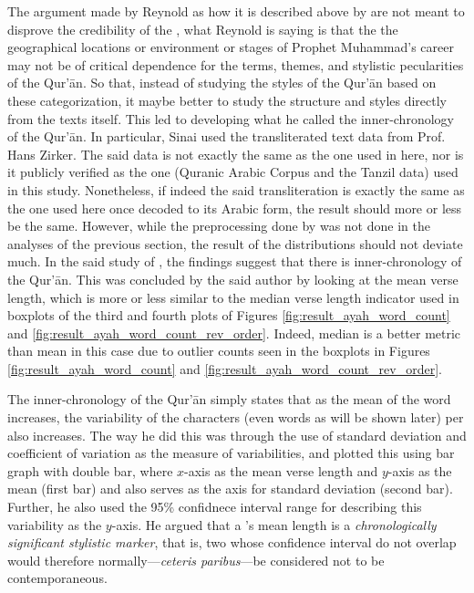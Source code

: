 The argument made by Reynold as how it is described above by  are not meant to disprove the credibility of the  , what Reynold is saying is that the the geographical locations or environment or stages of Prophet Muhammad's  career may not be of critical dependence for the terms, themes, and stylistic pecularities of the Qur'\=an. So that, instead of studying the styles of the Qur'\=an based on these categorization, it maybe better to study the structure and styles directly from the texts itself. This led  to developing what he called the inner-chronology of the Qur'\=an. In particular, Sinai used the transliterated text data from Prof. Hans Zirker. The said data is not exactly the same as the one used in here, nor is it publicly verified as the one (Quranic Arabic Corpus and the Tanzil data) used in this study. Nonetheless, if indeed the said transliteration is exactly the same as the one used here once decoded to its Arabic form, the result should more or less be the same. However, while the preprocessing done by  was not done in the analyses of the previous section, the result of the distributions should not deviate much. In the said study of , the findings suggest that there is inner-chronology of the Qur'\=an. This was concluded by the said author by looking at the mean verse length, which is more or less similar to the median verse length indicator used in boxplots of the third and fourth plots of Figures \ref{fig:result_ayah_word_count} and \ref{fig:result_ayah_word_count_rev_order}. Indeed, median is a better metric than mean in this case due to outlier counts seen in the boxplots in Figures \ref{fig:result_ayah_word_count} and \ref{fig:result_ayah_word_count_rev_order}.

The inner-chronology of the Qur'\=an simply states that as the mean of the word increases, the variability of the characters (even words as will be shown later) per   also increases. The way he did this was through the use of standard deviation and coefficient of variation as the measure of variabilities, and plotted this using bar graph with double bar, where $x$-axis as the mean verse length and $y$-axis as the mean (first bar) and also serves as the axis for standard deviation (second bar). Further, he also used the 95\% confidnece interval range for describing this variability as the $y$-axis. He argued that a 's  mean   length is a \textit{chronologically significant stylistic marker}, that is, two   whose confidence interval do not overlap would therefore normally---\textit{ceteris paribus}---be considered not to be contemporaneous. 

